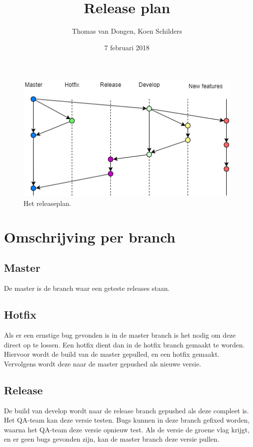 \documentclass[12pt]{article}
\title{Release plan}
\author{Thomas van Dongen, Koen Schilders}
\date{7 februari 2018}
\begin{document}
\begin{titlepage}
\maketitle
\end{titlepage}

\begin{figure}
	\includegraphics[width=\textwidth]{images/SOP6_Release.png}
	\caption{Het releaseplan.}
\end{figure}

\section{Omschrijving per branch}
\subsection{Master}
De master is de branch waar een geteste releases staan.
\subsection{Hotfix}
Als er een ernstige bug gevonden is in de master branch is het nodig om deze direct op te lossen. Een hotfix dient dan in de hotfix branch gemaakt te worden. Hiervoor wordt de build van de master gepulled, en een hotfix gemaakt. Vervolgens wordt deze naar de master gepushed als nieuwe versie.
\subsection{Release}
De build van develop wordt naar de release branch gepushed als deze compleet is. Het QA-team kan deze versie testen. Bugs kunnen in deze branch gefixed worden, waarna het QA-team deze versie opnieuw test. Als de versie de groene vlag krijgt, en er geen bugs gevonden zijn, kan de master branch deze versie pullen.
\end{document}
